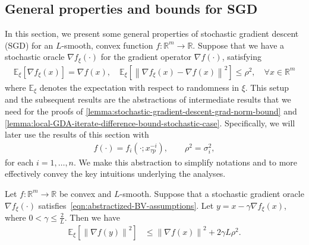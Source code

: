 \documentclass{article}
\newcommand{\reals}{\mathbb{R}}
\newcommand{\sqnorm}[1]{\left\| #1 \right\|^2}
\theoremstyle{plain}
\theoremstyle{remark}
\begin{document}
\subsection{General properties and bounds for SGD}

In this section, we present some general properties of stochastic gradient descent (SGD) for an $L$-smooth, convex function $f \colon \reals^m \to \reals$.
Suppose that we have a stochastic oracle $\nabla f_\xi (\cdot)$ for the gradient operator $\nabla f (\cdot)$, satisfying
\begin{align}
\label{eqn:abstractized-BV-assumptions}
    \mathbb{E}_\xi [\nabla f_\xi (x)] = \nabla f (x) , \quad \mathbb{E}_\xi \left[ \sqnorm{\nabla f_\xi (x) - \nabla f(x)} \right] \le \rho^2 , \quad \forall x \in \reals^m 
\end{align}
where $\mathbb{E}_\xi$ denotes the expectation with respect to randomness in $\xi$.
This setup and the subsequent results are the abstractions of intermediate results that we need for the proofs of \cref{lemma:stochastic-gradient-descent-grad-norm-bound} and \cref{lemma:local-GDA-iterate-difference-bound-stochastic-case}.
Specifically, we will later use the results of this section with
\begin{align*}
    f(\cdot) = f_i (\cdot; x_{\tau p}^{-i}), \qquad \rho^2 = \sigma_i^2 ,
\end{align*}
for each $i=1,\dots,n$.
We make this abstraction to simplify notations and to more effectively convey the key intuitions underlying the analyses.

\begin{lemma}
\label{lemma:stochastic-gradient-descent-grad-norm-bound-abstract-version}
Let $f \colon \reals^m \to \reals$ be convex and $L$-smooth. 
Suppose that a stochastic gradient oracle $\nabla f_\xi (\cdot)$ satisfies~\eqref{eqn:abstractized-BV-assumptions}.
Let $y = x - \gamma \nabla f_\xi (x)$, where $0 < \gamma \le \frac{2}{L}$. Then we have
\begin{align*}
    \mathbb{E}_\xi \left[ \sqnorm{\nabla f(y)} \right] & \le \sqnorm{\nabla f(x)} + 2 \gamma L\rho^2 .
\end{align*}
\end{lemma}
\end{document}
